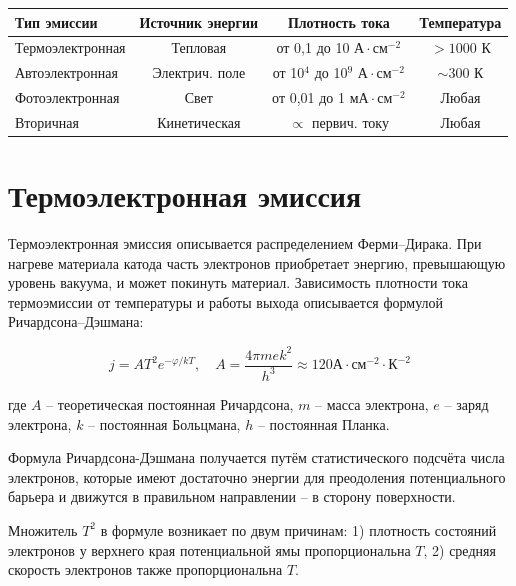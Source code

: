 \documentclass[12pt]{article}
\begin{document}
\begin{table}[H]
    \centering
    \begin{tabular}{lccc}
        \toprule
        Тип эмиссии & Источник энергии & Плотность тока & Температура  \\
        \midrule
        Термоэлектронная & Тепловая & от 0,1 до 10 $\text{А}\cdot\text{см}^{-2}$ & $> 1000$ К  \\
        Автоэлектронная & Электрич. поле & от 10$^4$ до 10$^9$ $\text{А}\cdot\text{см}^{-2}$ & $\sim 300$ К  \\
        Фотоэлектронная & Свет & от 0,01 до 1 $\text{мА}\cdot\text{см}^{-2}$ & Любая  \\
        Вторичная & Кинетическая & $\propto$ первич. току & Любая \\
        \bottomrule
    \end{tabular}
    \label{tab:emission_types}
\end{table}

\newpage
\section*{Термоэлектронная эмиссия}
Термоэлектронная эмиссия описывается распределением Ферми--Дирака. При нагреве материала катода часть электронов приобретает энергию, превышающую уровень вакуума, и может покинуть материал. Зависимость плотности тока термоэмиссии от температуры и работы выхода описывается формулой Ричардсона--Дэшмана:

\begin{equation}
    j = A T^2 e^{-\varphi / kT}, \quad A = \frac{4\pi m e k^2}{h^3} \approx 120 \text{А}\cdot\text{см}^{-2}\cdot\text{К}^{-2}
    \label{eq:richardson}
\end{equation}

где $A$ -- теоретическая постоянная Ричардсона, $m$ -- масса электрона, $e$ -- заряд электрона, $k$ -- постоянная Больцмана, $h$ -- постоянная Планка.

Формула Ричардсона-Дэшмана получается путём статистического подсчёта числа электронов, которые имеют достаточно энергии для преодоления потенциального барьера и движутся в правильном направлении -- в сторону поверхности.

Множитель $T^2$ в формуле возникает по двум причинам: 1) плотность состояний электронов у верхнего края потенциальной ямы пропорциональна $T$, 2) средняя скорость электронов также пропорциональна $T$.%
\end{document}
